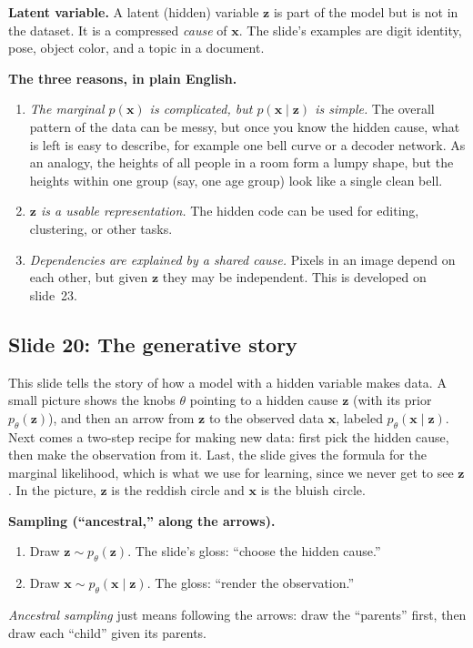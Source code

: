 \textbf{Latent variable.} A latent (hidden) variable $\mathbf{z}$ is part of the model but is not in the dataset. It is a compressed \textit{cause} of $\mathbf{x}$. The slide's examples are digit identity, pose, object color, and a topic in a document.

\textbf{The three reasons, in plain English.}
\begin{enumerate}
\item \textit{The marginal $p(\mathbf{x})$ is complicated, but $p(\mathbf{x}\mid\mathbf{z})$ is simple.} The overall pattern of the data can be messy, but once you know the hidden cause, what is left is easy to describe, for example one bell curve or a decoder network. As an analogy, the heights of all people in a room form a lumpy shape, but the heights within one group (say, one age group) look like a single clean bell.
\item \textit{$\mathbf{z}$ is a usable representation.} The hidden code can be used for editing, clustering, or other tasks.
\item \textit{Dependencies are explained by a shared cause.} Pixels in an image depend on each other, but given $\mathbf{z}$ they may be independent. This is developed on slide~23.
\end{enumerate}

\subsection*{Slide 20: The generative story}

This slide tells the story of how a model with a hidden variable makes data. A small picture shows the knobs $\theta$ pointing to a hidden cause $\mathbf{z}$ (with its prior $p_\theta(\mathbf{z})$), and then an arrow from $\mathbf{z}$ to the observed data $\mathbf{x}$, labeled $p_\theta(\mathbf{x}\mid\mathbf{z})$. Next comes a two-step recipe for making new data: first pick the hidden cause, then make the observation from it. Last, the slide gives the formula for the marginal likelihood, which is what we use for learning, since we never get to see $\mathbf{z}$. In the picture, $\mathbf{z}$ is the reddish circle and $\mathbf{x}$ is the bluish circle.

\textbf{Sampling (``ancestral,'' along the arrows).}
\begin{enumerate}
\item Draw $\mathbf{z}\sim p_\theta(\mathbf{z})$. The slide's gloss: ``choose the hidden cause.''
\item Draw $\mathbf{x}\sim p_\theta(\mathbf{x}\mid\mathbf{z})$. The gloss: ``render the observation.''
\end{enumerate}
\textit{Ancestral sampling} just means following the arrows: draw the ``parents'' first, then draw each ``child'' given its parents.

